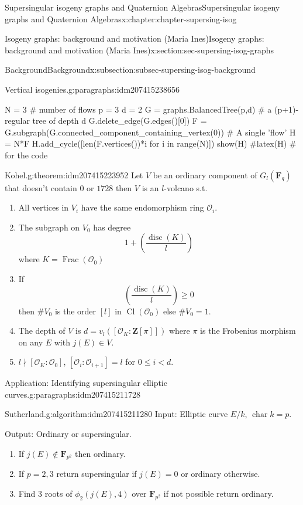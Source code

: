 \documentclass[oneside,10pt,]{book}
\numberwithin{equation}{section}
\newcommand{\lb}{[}
\newcommand{\rb}{]}
\newcommand{\ZZ}{\mathbf{Z}}
\newcommand{\FF}{\mathbf{F}}
\newcommand{\ints}{\mathcal{O}}
\DeclareMathOperator{\Cl}{Cl}
\DeclareMathOperator{\disc}{disc}
\DeclareMathOperator{\characteristic}{char}
\DeclareMathOperator{\Frac}{Frac}
\newcommand{\lt}{<}
\begin{document}
\begin{chapterptx}{Supersingular isogeny graphs and Quaternion Algebras}{}{Supersingular isogeny graphs and Quaternion Algebras}{}{}{x:chapter:chapter-supersing-isog}
\begin{sectionptx}{Isogeny graphs: background and motivation (Maria Ines)}{}{Isogeny graphs: background and motivation (Maria Ines)}{}{}{x:section:sec-supersing-isog-graphs}
\begin{subsectionptx}{Background}{}{Background}{}{}{x:subsection:subsec-supersing-isog-background}
\begin{paragraphs}{Vertical isogenies.}{g:paragraphs:idm207415238656}
\begin{sageinput}
N = 3 # number of flows
p = 3
d = 2
G = graphs.BalancedTree(p,d) # a (p+1)-regular tree of depth d
G.delete_edge(G.edges()[0])
F = G.subgraph(G.connected_component_containing_vertex(0)) # A single 'flow'
H = N*F
H.add_cycle([len(F.vertices())*i for i in range(N)])
show(H)
#latex(H) # for the code
\end{sageinput}
\begin{theorem}{Kohel.}{}{g:theorem:idm207415223952}%
Let \(V\) be an ordinary component of \(G_l(\FF_q)\) that doesn't contain \(0\) or \(1728\) then \(V\) is an \(l\)-volcano s.t.%
\begin{enumerate}
\item{}All vertices in \(V_i\) have the same endomorphism ring \(\ints_i\).%
\item{}The subgraph on \(V_0\) has degree%
\begin{equation*}
1+ \left(\frac {\disc(K)}{l}\right)
\end{equation*}
where \(K = \Frac(\ints_0)\)%
\item{}If%
\begin{equation*}
\left(\frac {\disc(K)}{l}\right) \ge 0
\end{equation*}
then \(\#V_0\) is the order \(\lb l \rb\) in \(\Cl (\ints_0)\) else \(\#V_0 = 1\).%
\item{}The depth of \(V\) is \(d = v_l (\lb \ints_K : \ZZ\lb\pi \rb\rb)\) where \(\pi\) is the Frobenius morphism on any \(E\) with \(j(E) \in V\).%
\item{}\(l \nmid \lb \ints_K : \ints_0 \rb\), \(\lb \ints_i : \ints_{i+1}\rb = l\) for \(0\le i \lt d\).%
\end{enumerate}
%
\end{theorem}
\end{paragraphs}%
\begin{paragraphs}{Application: Identifying supersingular elliptic curves.}{g:paragraphs:idm207415211728}%
\begin{algorithm}{Sutherland.}{}{g:algorithm:idm207415211280}%
Input: Elliptic curve \(E/k\), \(\characteristic k = p\).%
\par
Output: Ordinary or supersingular.%
\par
%
\begin{enumerate}
\item{}If \(j(E) \not \in \FF_{p^2}\) then ordinary.%
\item{}If \(p  =2,3\) return supersingular if \(j(E) = 0\) or ordinary otherwise.%
\item{}Find 3 roots of \(\phi_2(j(E), 4)\) over \(\FF_{p^2}\) if not possible return ordinary.%

\end{enumerate}
\end{algorithm}
\end{paragraphs}
\end{subsectionptx}
\end{sectionptx}
\end{chapterptx}
\end{document}

